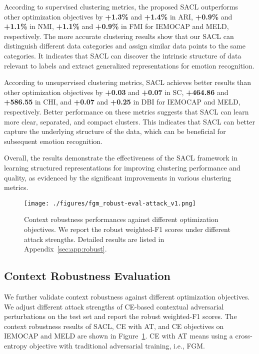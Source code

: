 \documentclass[11pt]{article}
\begin{document}
According to supervised clustering metrics, the proposed SACL outperforms other optimization objectives by \textbf{+1.3\%} and \textbf{+1.4\%} in ARI, \textbf{+0.9\%} and \textbf{+1.1\%} in NMI, \textbf{+1.1\%} and \textbf{+0.9\%} in FMI for  IEMOCAP and MELD, respectively.
The more accurate clustering results show that our SACL can distinguish different data categories and assign similar data points to the same categories. It indicates that SACL can discover the intrinsic structure of data relevant to labels and extract generalized representations for emotion recognition.

According to unsupervised clustering metrics, SACL achieves better results than other optimization objectives by \textbf{+0.03} and \textbf{+0.07} in SC, \textbf{+464.86} and \textbf{+586.55} in CHI, and \textbf{+0.07} and \textbf{+0.25} in DBI for IEMOCAP and MELD, respectively.
Better performance on these metrics suggests that SACL can learn more clear, separated, and compact clusters.
This indicates that SACL can better capture the underlying structure of the data, which can be beneficial for subsequent emotion recognition.

Overall, the results demonstrate the effectiveness of the SACL framework in learning structured representations for improving clustering performance and quality, as evidenced by the significant improvements in various clustering metrics.

\begin{figure}[t]
  \centering
    \texttt{[image: ./figures/fgm\_robust-eval-attack\_v1.png]}
    \caption{Context robustness performances against different optimization objectives. We report the robust weighted-F1 scores under different attack strengths.
    Detailed results are listed in Appendix~\ref{sec:app:robust}.
    }
  \label{fig:robust}
\end{figure}

\subsection{Context Robustness Evaluation}
We further validate context robustness against different optimization objectives. We adjust different attack strengths of CE-based contextual adversarial perturbations on the test set and report the robust weighted-F1 scores.
The context robustness results of SACL, CE with AT, and CE objectives  on IEMOCAP and MELD are shown in Figure~\ref{fig:robust}.
CE with AT means using a cross-entropy objective with traditional adversarial training, i.e., FGM.
\end{document}
